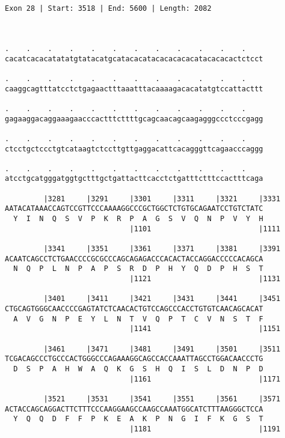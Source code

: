 \documentclass{article}
\begin{document}
\begin{Verbatim}
                                                 
 
Exon 28 | Start: 3518 | End: 5600 | Length: 2082



.    .    .    .    .    .    .    .    .    .    .    .    
cacatcacacatatatgtatacatgcatacacatacacacacacatacacacactctcct
                                                            
.    .    .    .    .    .    .    .    .    .    .    .    
caaggcagtttatcctctgagaactttaaatttacaaaagacacatatgtccattacttt
                                                            
.    .    .    .    .    .    .    .    .    .    .    .    
gagaaggacaggaaagaacccactttcttttgcagcaacagcaagagggccctcccgagg
                                                            
.    .    .    .    .    .    .    .    .    .    .    .    
ctcctgctccctgtcataagtctccttgttgaggacattcacagggttcagaacccaggg
                                                            
.    .    .    .    .    .    .    .    .    .    .    .    
atcctgcatgggatggtgctttgctgattacttcacctctgatttctttccactttcaga
                                                            
         |3281     |3291     |3301     |3311     |3321     |3331
AATACATAAACCAGTCCGTTCCCAAAAGGCCCGCTGGCTCTGTGCAGAATCCTGTCTATC
  Y  I  N  Q  S  V  P  K  R  P  A  G  S  V  Q  N  P  V  Y  H
                             |1101                         |1111
  
         |3341     |3351     |3361     |3371     |3381     |3391
ACAATCAGCCTCTGAACCCCGCGCCCAGCAGAGACCCACACTACCAGGACCCCCACAGCA
  N  Q  P  L  N  P  A  P  S  R  D  P  H  Y  Q  D  P  H  S  T
                             |1121                         |1131
  
         |3401     |3411     |3421     |3431     |3441     |3451
CTGCAGTGGGCAACCCCGAGTATCTCAACACTGTCCAGCCCACCTGTGTCAACAGCACAT
  A  V  G  N  P  E  Y  L  N  T  V  Q  P  T  C  V  N  S  T  F
                             |1141                         |1151
  
         |3461     |3471     |3481     |3491     |3501     |3511
TCGACAGCCCTGCCCACTGGGCCCAGAAAGGCAGCCACCAAATTAGCCTGGACAACCCTG
  D  S  P  A  H  W  A  Q  K  G  S  H  Q  I  S  L  D  N  P  D
                             |1161                         |1171
  
         |3521     |3531     |3541     |3551     |3561     |3571
ACTACCAGCAGGACTTCTTTCCCAAGGAAGCCAAGCCAAATGGCATCTTTAAGGGCTCCA
  Y  Q  Q  D  F  F  P  K  E  A  K  P  N  G  I  F  K  G  S  T
                             |1181                         |1191
  

\end{Verbatim}
\end{document}

